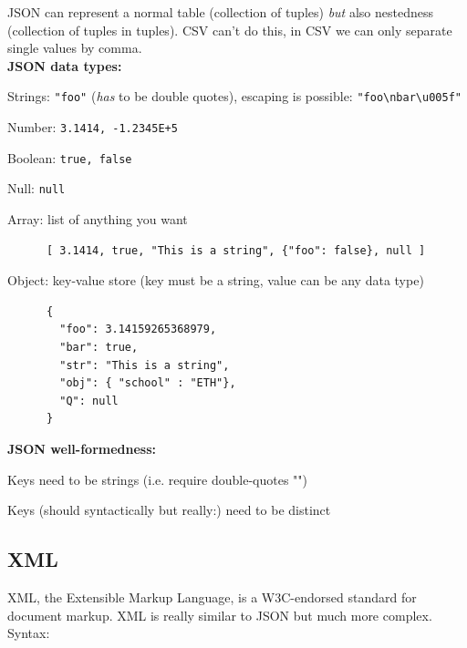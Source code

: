 \documentclass[11pt,oneside,a4paper]{article}
\begin{document}
JSON can represent a normal table (collection of tuples) \textit{but} also nestedness (collection of tuples in tuples). CSV can't do this, in CSV we can only separate single values by comma.\\
\textbf{JSON data types:}

\begin{compactitem}
	\item Strings: \verb|"foo"| (\textit{has} to be double quotes), escaping is possible: \verb|"foo\nbar\u005f"|
	\item Number: \verb|3.1414, -1.2345E+5|
	\item Boolean: \verb|true, false|
	\item Null: \verb|null|
	\item Array: list of anything you want
	\begin{verbatim}
	  [ 3.1414, true, "This is a string", {"foo": false}, null ]
	\end{verbatim}
	\item Object: key-value store (key must be a string, value can be any data type)
	\begin{verbatim}
	  {
	    "foo": 3.14159265368979,
	    "bar": true,
	    "str": "This is a string",
	    "obj": { "school" : "ETH"},
	    "Q": null
	  }
	\end{verbatim}	
\end{compactitem}

\textbf{JSON well-formedness:}

\begin{compactitem}
	\item Keys need to be strings (i.e. require double-quotes "")
	\item Keys (should syntactically but really:) need to be distinct\\
\end{compactitem}

\subsection{XML}

XML, the Extensible Markup Language, is a W3C-endorsed standard for document markup. XML is really similar to JSON but much more complex. Syntax:
\end{document}
